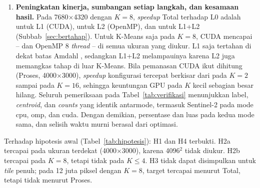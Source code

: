 \begin{enumerate}
    \item \textbf{Peningkatan kinerja, sumbangan setiap langkah, dan kesamaan hasil.} Pada 7680$\times$4320 dengan $K=8$, \emph{speedup} Total terhadap L0 adalah \LdSTotalDelapan{} untuk L1 (CUDA), \LdbSTotalDelapan{} untuk L2 (OpenMP), dan \LdLdSTotalDelapan{} untuk L1+L2 (Subbab~\ref{sec:bertahap}). Untuk K-Means saja pada $K=8$, CUDA mencapai \HDuaCudaMin--\HDuaCudaMax{} dan OpenMP 8 \emph{thread} \HDuaOmpMin--\HDuaOmpMax{} di semua ukuran yang diukur. L1 saja tertahan di dekat batas Amdahl \AmdBatas, sedangkan L1+L2 melampauinya karena L2 juga memangkas tahap di luar K-Means. Bila pemanasan CUDA ikut dihitung (Proses, 4000$\times$3000), \emph{speedup} konfigurasi tercepat berkisar dari \SProsesMin{} pada $K=2$ sampai \SProsesMax{} pada $K=16$, sehingga keuntungan GPU pada $K$ kecil sebagian besar hilang. Seluruh pemeriksaan pada Tabel~\ref{tab:verifikasi} menunjukkan label, \emph{centroid}, dan \emph{counts} yang identik antarmode, termasuk  Sentinel-2 pada mode cpu, omp, dan cuda. Dengan demikian, persentase dan luas pada kedua mode sama, dan selisih waktu murni berasal dari optimasi.
\end{enumerate}

Terhadap hipotesis awal (Tabel~\ref{tab:hipotesis}): H1 dan H4 terbukti. H2a tercapai pada ukuran terdekat (4000$\times$3000), karena 4096$^2$ tidak diukur. H2b tercapai pada $K=8$, tetapi tidak pada $K\leq4$. H3 tidak dapat disimpulkan untuk \emph{tile} penuh; pada 12 juta piksel dengan $K=8$, target tercapai menurut Total, tetapi tidak menurut Proses.

